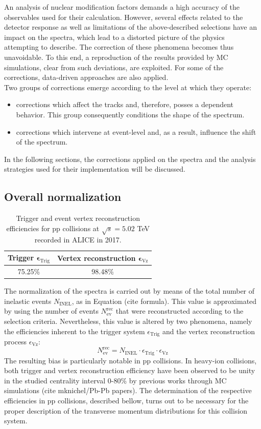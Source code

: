 \documentclass[12pt,a4paper]{report}
\begin{document}
An analysis of nuclear modification factors demands a high accuracy of the observables used for their calculation. However, several effects related to the detector response as well as limitations of the above-described selections have an impact on the \pt spectra, which lead to a distorted picture of the physics attempting to describe. The correction of these phenomena becomes thus unavoidable. To this end, a reproduction of the results provided by MC simulations, clear from such deviations, are exploited. For some of the corrections, data-driven approaches are also applied. \\
Two groups of corrections emerge according to the level at which they operate: 
\begin{itemize}
\item corrections which affect the tracks and, therefore, posses a \pt dependent behavior. This group consequently conditions the shape of the spectrum.
\item corrections which intervene at event-level and, as a result, influence the shift of the spectrum.
\end{itemize}
In the following sections, the corrections applied on the \pt spectra and the analysis strategies used for their implementation will be discussed.
\subsection{Overall normalization}
\label{Norm}
\begin{table}[H]
\centering
\renewcommand{\arraystretch}{1.5}
\begin{tabular}{|c|c|}
\toprule
\rowcolor{headerBlue}  \textbf{Trigger} $\boldsymbol \epsilon_\text{Trig}$ &  \textbf{Vertex reconstruction} $\boldsymbol \epsilon_\text{Vz}$\\
\hline
75.25\%	&	98.48\%		 \\
\bottomrule
\end{tabular}
\caption{Trigger and event vertex reconstruction efficiencies for pp collisions at $\sqrt{s} = 5.02$ TeV recorded in ALICE in 2017.}
\label{tab:effs}
\end{table} 
The normalization of the \pt spectra is carried out by means of the total number of inelastic events $N_\text{INEL}$, as in Equation (cite formula). This value is approximated by using the number of events $N_\text{ev}^\text{rec}$ that were reconstructed according to the selection criteria. Nevertheless, this value is altered by two phenomena, namely the efficiencies inherent to the trigger system $\epsilon_\text{Trig}$ and the vertex reconstruction process $\epsilon_\text{Vz}$:
\begin{equation}
N_\text{ev}^\text{rec} = N_\text{INEL}\cdot \epsilon_\text{Trig} \cdot \epsilon_\text{Vz}
\end{equation}
The resulting bias is particularly notable in pp collisions. In heavy-ion collisions, both trigger and vertex reconstruction efficiency have been observed to be unity in the studied centrality interval 0-80\% by previous works through MC simulations (cite mknichel/Pb-Pb papers). The determination of the respective efficiencies in pp collisions, described bellow, turns out to be necessary for the proper description of the transverse momentum distributions for this collision system. 
\end{document}
